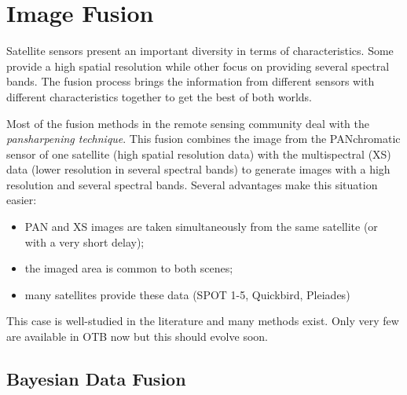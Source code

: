 
\chapter{Image Fusion }\label{sec:Fusion}

Satellite sensors present an important diversity in terms of characteristics.
Some provide a high spatial resolution while other focus on providing several
spectral bands. The fusion process brings the information from different
sensors with different characteristics together to get the best of both
worlds.

Most of the fusion methods in the remote sensing community deal with
the {\em pansharpening technique}. This fusion combines the image from
the PANchromatic sensor of one satellite (high spatial resolution
data) with the multispectral (XS) data (lower resolution in several
spectral bands) to generate images with a high resolution and several
spectral bands. Several advantages make this situation easier:

\begin{itemize}
\item PAN and XS images are taken simultaneously from the same satellite (or
with a very short delay);
\item the imaged area is common to both scenes;
\item many satellites provide these data (SPOT 1-5, Quickbird, Pleiades)
\end{itemize}

This case is well-studied in the literature and many methods exist. Only very
few are available in OTB now but this should evolve soon.



\section{Bayesian Data Fusion}\label{secBayesian}




